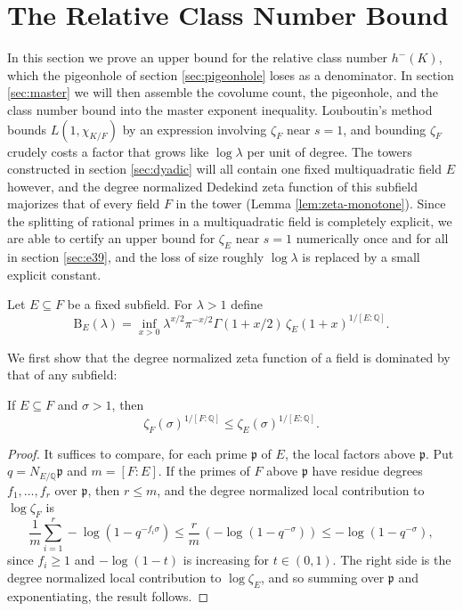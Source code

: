 \section{The Relative Class Number Bound}\label{sec:louboutin}

In this section we prove an upper bound for the relative class number $h^-(K)$, which the pigeonhole of section \ref{sec:pigeonhole} loses as a denominator.  In section \ref{sec:master} we will then assemble the covolume count, the pigeonhole, and the class number bound into the master exponent inequality.  Louboutin's method \cite{Louboutin} bounds $L(1,\chi_{K/F})$ by an expression involving $\zeta_F$ near $s=1$, and bounding $\zeta_F$ crudely costs a factor that grows like $\log\lambda$ per unit of degree.  The towers constructed in section \ref{sec:dyadic} will all contain one fixed multiquadratic field $E$ however, and the degree normalized Dedekind zeta function of this subfield majorizes that of every field $F$ in the tower (Lemma \ref{lem:zeta-monotone}).  Since the splitting of rational primes in a multiquadratic field is completely explicit, we are able to certify an upper bound for $\zeta_E$ near $s=1$ numerically once and for all in section \ref{sec:e39}, and the loss of size roughly $\log\lambda$ is replaced by a small explicit constant.

Let $E\subseteq F$ be a fixed subfield.  For $\lambda>1$ define
\begin{equation}\label{eq:B-def}
   \mathrm{B}_E(\lambda)=\inf_{x>0}
   \lambda^{x/2}\pi^{-x/2}\Gamma(1+x/2)\,\zeta_E(1+x)^{1/[E:\mathbb{Q}]}.
\end{equation}

We first show that the degree normalized zeta function of a field is dominated by that of any subfield:
\begin{lemma}\label{lem:zeta-monotone}
If $E\subseteq F$ and $\sigma>1$, then
\[
   \zeta_F(\sigma)^{1/[F:\mathbb{Q}]}
   \leq \zeta_E(\sigma)^{1/[E:\mathbb{Q}]}.
\]
\end{lemma}

\begin{proof}
It suffices to compare, for each prime $\mathfrak p$ of $E$, the local factors above $\mathfrak p$.  Put $q=N_{E/\mathbb{Q}}\mathfrak p$ and $m=[F:E]$.  If the primes of $F$ above $\mathfrak p$ have residue degrees $f_1,\dots,f_r$ over $\mathfrak p$, then $r\leq m$, and the degree normalized local contribution to $\log\zeta_F$ is
\[
   \frac1m\sum_{i=1}^r -\log(1-q^{-f_i\sigma})
   \leq \frac{r}{m}\,(-\log(1-q^{-\sigma}))
   \leq -\log(1-q^{-\sigma}),
\]
since $f_i\geq1$ and $-\log(1-t)$ is increasing for $t\in(0,1)$.  The right side is the degree normalized local contribution to $\log\zeta_E$, and so summing over $\mathfrak p$ and exponentiating, the result follows.
\end{proof}

